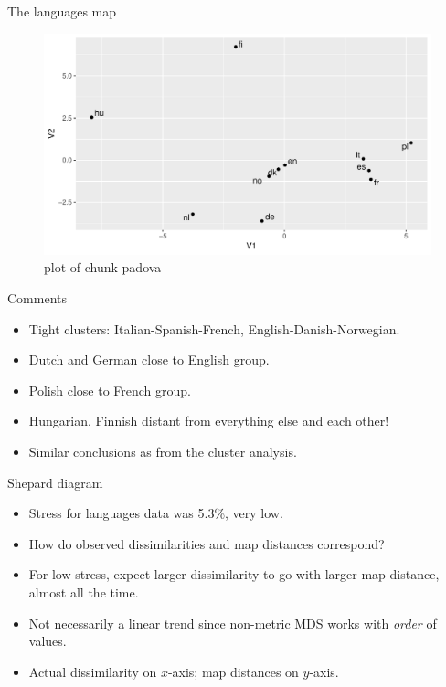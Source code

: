 \documentclass[ignorenonframetext,]{beamer}
\begin{document}
\begin{frame}{The languages map}
\protect\hypertarget{the-languages-map}{}

\begin{figure}
\centering
\includegraphics{figure/padova-1.pdf}
\caption{plot of chunk padova}
\end{figure}

\end{frame}

\begin{frame}{Comments}
\protect\hypertarget{comments-3}{}

\begin{itemize}
\item
  Tight clusters: Italian-Spanish-French, English-Danish-Norwegian.
\item
  Dutch and German close to English group.
\item
  Polish close to French group.
\item
  Hungarian, Finnish distant from everything else and each other!
\item
  Similar conclusions as from the cluster analysis.
\end{itemize}

\end{frame}

\begin{frame}{Shepard diagram}
\protect\hypertarget{shepard-diagram}{}

\begin{itemize}
\item
  Stress for languages data was 5.3\%, very low.
\item
  How do observed dissimilarities and map distances correspond?
\item
  For low stress, expect larger dissimilarity to go with larger map
  distance, almost all the time.
\item
  Not necessarily a linear trend since non-metric MDS works with
  \emph{order} of values.
\item
  Actual dissimilarity on \(x\)-axis; map distances on \(y\)-axis.
\end{itemize}

\end{frame}
\end{document}
